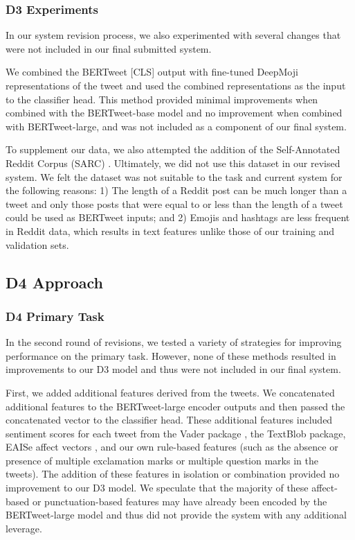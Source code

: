 \documentclass[11pt]{article}
\begin{document}
\subsubsection{D3 Experiments}
In our system revision process, we also experimented with several changes that were not included in our final submitted system.

We combined the BERTweet [CLS] output with fine-tuned DeepMoji \citealp{felbo-etal-2017-using} representations of the tweet and used the combined representations as the input to the classifier head. This method provided minimal improvements when combined with the BERTweet-base model and no improvement when combined with BERTweet-large, and was not included as a component of our final system.

To supplement our data, we also attempted the addition of the Self-Annotated Reddit Corpus (SARC) \citealp{khodak-etal-2018-large}. Ultimately, we did not use this dataset in our revised system. We felt the dataset was not suitable to the task and current system for the following reasons: 1) The length of a Reddit post can be much longer than a tweet and only those posts that were equal to or less than the length of a tweet could be used as BERTweet inputs; and 2) Emojis and hashtags are less frequent in Reddit data, which results in text features unlike those of our training and validation sets.

\subsection{D4 Approach}
\subsubsection{D4 Primary Task}
In the second round of revisions, we tested a variety of strategies for improving performance on the primary task. However, none of these methods resulted in improvements to our D3 model and thus were not included in our final system.

First, we added additional features derived from the tweets. We concatenated additional features to the BERTweet-large encoder outputs and then passed the concatenated vector to the classifier head. These additional features included sentiment scores for each tweet from the Vader package \citealp{Hutto2014VADERAP}, the TextBlob package, EAISe affect vectors \citealp{babanejad-etal-2020-affective}, and our own rule-based features (such as the absence or presence of multiple exclamation marks or multiple question marks in the tweets). The addition of these features in isolation or combination provided no improvement to our D3 model. We speculate that the majority of these affect-based or punctuation-based features may have already been encoded by the BERTweet-large model and thus did not provide the system with any additional leverage.
\end{document}
